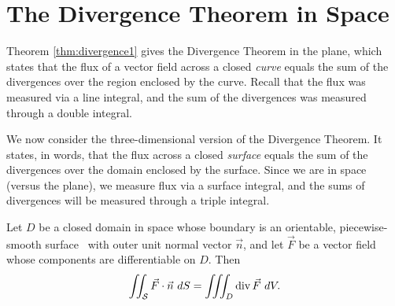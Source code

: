 \section{The Divergence Theorem in Space}\label{sec:divergence_in_space}

Theorem \ref{thm:divergence1} gives the Divergence Theorem in the plane, which states that the flux of a vector field across a closed \emph{curve} equals the sum of the divergences over the region enclosed by the curve. Recall that the flux was measured via a line integral, and the sum of the divergences was measured through a double integral.

We now consider the three-dimensional version of the Divergence Theorem. It states, in words, that the flux across a closed \emph{surface} equals the sum of the divergences over the domain enclosed by the surface. Since we are in space (versus the plane), we measure flux via a surface integral, and the sums of divergences will be measured through a triple integral.

{Let $D$ be a closed domain in space whose boundary is an orientable, piecewise-smooth surface \surfaceS\ with outer unit normal vector $\vec n$, and let $\vec F$ be a vector field whose components are differentiable on $D$. Then
$$\iint_{\mathcal{S}} \vec F\cdot\vec n\ dS =\iiint_D \operatorname{div} \vec F\ dV.$$ 
}

